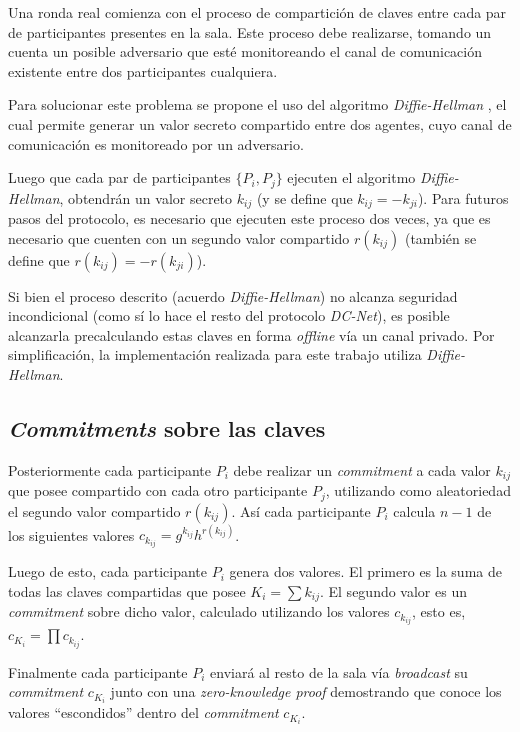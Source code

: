 Una ronda real comienza con el proceso de compartición de claves entre cada 
par de participantes presentes en la sala. Este proceso debe realizarse, 
tomando un cuenta un posible adversario que esté monitoreando el canal de 
comunicación existente entre dos participantes cualquiera.

Para solucionar este problema se propone el uso del algoritmo 
\emph{Diffie-Hellman} \cite{diffie1976new}, el cual permite generar un valor 
secreto compartido entre dos agentes, cuyo canal de comunicación es 
monitoreado por un adversario.

Luego que cada par de participantes $\{P_i, P_j\}$ ejecuten el algoritmo 
\emph{Diffie-Hellman}, obtendrán un valor secreto $k_{ij}$ 
(y se define que $k_{ij} = -k_{ji}$). Para futuros pasos del protocolo, es 
necesario que ejecuten este proceso dos veces, ya que es necesario que cuenten 
con un segundo valor compartido $r(k_{ij})$ (también se define que 
$r(k_{ij}) = -r(k_{ji})$).

Si bien el proceso descrito (acuerdo \emph{Diffie-Hellman}) no alcanza 
seguridad incondicional (como sí lo hace el resto del protocolo 
\emph{DC-Net}), es posible alcanzarla precalculando estas claves en forma 
\emph{offline} vía un canal privado. Por simplificación, la implementación 
realizada para este trabajo utiliza \emph{Diffie-Hellman}.

\subsection{\emph{Commitments} sobre las claves}

Posteriormente cada participante $P_i$ debe realizar un \emph{commitment} a 
cada valor $k_{ij}$ que posee compartido con cada otro participante $P_j$, 
utilizando como aleatoriedad el segundo valor compartido $r(k_{ij})$. Así cada 
participante $P_i$ calcula $n - 1$ de los siguientes valores 
$c_{k_{ij}} = g^{k_{ij}} h^{r(k_{ij})}$.

Luego de esto, cada participante $P_i$ genera dos valores. El primero es 
la suma de todas las claves compartidas que posee $K_i = \sum k_{ij}$. El 
segundo valor es un \emph{commitment} sobre dicho valor, calculado utilizando 
los valores $c_{k_{ij}}$, esto es, 
$c_{K_i} = \prod c_{k_{ij}}$.

Finalmente cada participante $P_i$ enviará al resto de la sala vía 
\emph{broadcast} su \emph{commitment} $c_{K_i}$ junto con una 
\emph{zero-knowledge proof} demostrando que conoce los valores ``escondidos'' 
dentro del \emph{commitment} $c_{K_i}$.

